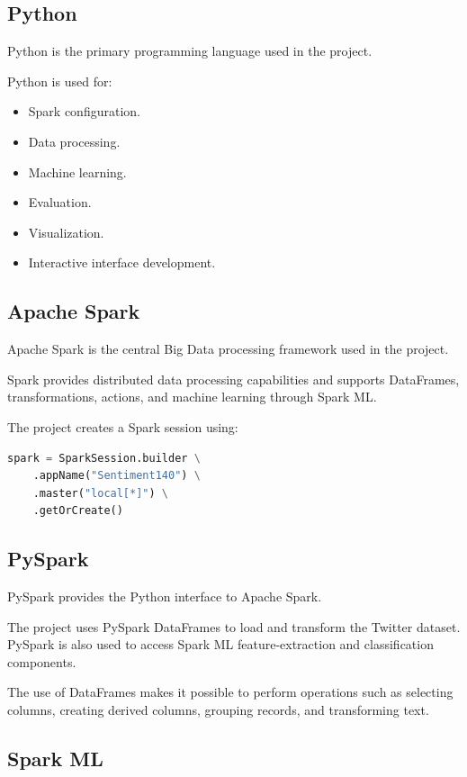 \documentclass[12pt,a4paper]{article}
\begin{document}
\subsection{Python}

Python is the primary programming language used in the project.

Python is used for:

\begin{itemize}
    \item Spark configuration.
    \item Data processing.
    \item Machine learning.
    \item Evaluation.
    \item Visualization.
    \item Interactive interface development.
\end{itemize}

\subsection{Apache Spark}

Apache Spark is the central Big Data processing framework used in the project.

Spark provides distributed data processing capabilities and supports DataFrames, transformations, actions, and machine learning through Spark ML.

The project creates a Spark session using:

\begin{lstlisting}[language=Python]
spark = SparkSession.builder \
    .appName("Sentiment140") \
    .master("local[*]") \
    .getOrCreate()
\end{lstlisting}

\subsection{PySpark}

PySpark provides the Python interface to Apache Spark.

The project uses PySpark DataFrames to load and transform the Twitter dataset. PySpark is also used to access Spark ML feature-extraction and classification components.

The use of DataFrames makes it possible to perform operations such as selecting columns, creating derived columns, grouping records, and transforming text.

\subsection{Spark ML}
\end{document}
